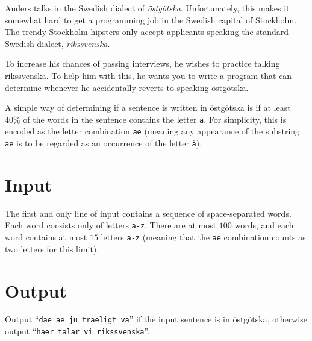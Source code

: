 Anders talks in the Swedish dialect of \emph{östgötska}.
Unfortunately, this makes it somewhat hard to get a programming job in the Swedish capital of Stockholm.
The trendy Stockholm hipsters only accept applicants speaking the standard Swedish dialect, \emph{rikssvenska}.

To increase his chances of passing interviews, he wishes to practice talking rikssvenska.
To help him with this, he wants you to write a program that can determine whenever he accidentally reverts to speaking östgötska.

A simple way of determining if a sentence is written in östgötska is if at least $40\%$ of the words in the sentence contains the letter \texttt{ä}.
For simplicity, this is encoded as the letter combination \texttt{ae} (meaning any appearance of the substring \texttt{ae} is to be regarded as an occurrence of the letter \texttt{ä}).

\section*{Input}
The first and only line of input contains a sequence of space-separated words.
Each word consists only of letters \texttt{a-z}.
There are at most $100$ words, and each word contains at most $15$ letters \texttt{a-z} (meaning that the \texttt{ae} combination counts as two letters for this limit).

\section*{Output}
Output ``\texttt{dae ae ju traeligt va}'' if the input sentence is in östgötska, otherwise output ``\texttt{haer talar vi rikssvenska}''.
